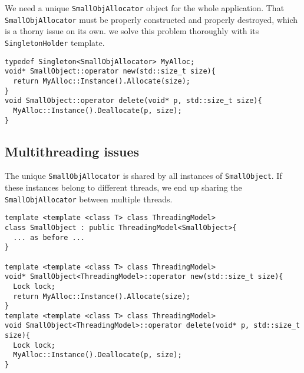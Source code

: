  We need a unique \texttt{SmallObjAllocator} object for the whole
 application. That \texttt{SmallObjAllocator} must be properly
 constructed and properly destroyed, which is a thorny issue on its
 own. we solve this problem thoroughly with its
 \texttt{SingletonHolder} template.

\begin{verbatim}
typedef Singleton<SmallObjAllocator> MyAlloc;
void* SmallObject::operator new(std::size_t size){
  return MyAlloc::Instance().Allocate(size);
}
void SmallObject::operator delete(void* p, std::size_t size){
  MyAlloc::Instance().Deallocate(p, size);
}
\end{verbatim}

 \subsection{Multithreading issues}

The unique \texttt{SmallObjAllocator} is shared by all instances of
\texttt{SmallObject}. If these instances belong to different threads,
we end up sharing the \texttt{SmallObjAllocator} between multiple
threads.

\begin{verbatim}
template <template <class T> class ThreadingModel>
class SmallObject : public ThreadingModel<SmallObject>{
  ... as before ...
}

template <template <class T> class ThreadingModel>
void* SmallObject<ThreadingModel>::operator new(std::size_t size){
  Lock lock;
  return MyAlloc::Instance().Allocate(size);
}
template <template <class T> class ThreadingModel>
void SmallObject<ThreadingModel>::operator delete(void* p, std::size_t size){
  Lock lock;
  MyAlloc::Instance().Deallocate(p, size);
}
\end{verbatim}
